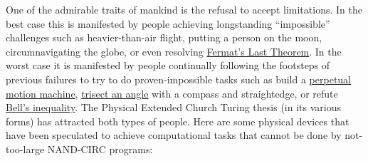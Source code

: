 One of the admirable traits of mankind is the refusal to accept
limitations. In the best case this is manifested by people achieving
longstanding ``impossible'' challenges such as heavier-than-air flight,
putting a person on the moon, circumnavigating the globe, or even
resolving
\href{https://en.wikipedia.org/wiki/Fermat\%27s_Last_Theorem}{Fermat's
Last Theorem}. In the worst case it is manifested by people continually
following the footsteps of previous failures to try to do
proven-impossible tasks such as build a
\href{https://en.wikipedia.org/wiki/Perpetual_motion}{perpetual motion
machine}, \href{https://en.wikipedia.org/wiki/Angle_trisection}{trisect
an angle} with a compass and straightedge, or refute
\href{https://en.wikipedia.org/wiki/Bell\%27s_theorem}{Bell's
inequality}. The Physical Extended Church Turing thesis (in its various
forms) has attracted both types of people. Here are some physical
devices that have been speculated to achieve computational tasks that
cannot be done by not-too-large NAND-CIRC programs:

